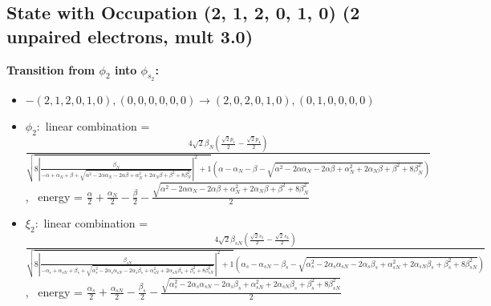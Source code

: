 \documentclass[12pt,a4paper]{article}
\begin{document}
\subsection*{State with Occupation (2, 1, 2, 0, 1, 0) (2 unpaired electrons, mult 3.0)}
        \noindent\textbf{Transition from $\phi_{2}$ into $\phi_{s_{2}}$:}
        \begin{itemize}
            \item $- (2, 1, 2, 0, 1, 0), (0, 0, 0, 0, 0, 0) \rightarrow (2, 0, 2, 0, 1, 0), (0, 1, 0, 0, 0, 0)$
        
            \item $\phi_{2}:$ linear combination = $\frac{4 \sqrt{2} \beta_{N} \left(\frac{\sqrt{2} p_{1}}{2} - \frac{\sqrt{2} p_{4}}{2}\right)}{\sqrt{8 \left|{\frac{\beta_{N}}{- \alpha + \alpha_{N} + \beta + \sqrt{\alpha^{2} - 2 \alpha \alpha_{N} - 2 \alpha \beta + \alpha_{N}^{2} + 2 \alpha_{N} \beta + \beta^{2} + 8 \beta_{N}^{2}}}}\right|^{2} + 1} \left(\alpha - \alpha_{N} - \beta - \sqrt{\alpha^{2} - 2 \alpha \alpha_{N} - 2 \alpha \beta + \alpha_{N}^{2} + 2 \alpha_{N} \beta + \beta^{2} + 8 \beta_{N}^{2}}\right)}$, \
            energy = $\frac{\alpha}{2} + \frac{\alpha_{N}}{2} - \frac{\beta}{2} - \frac{\sqrt{\alpha^{2} - 2 \alpha \alpha_{N} - 2 \alpha \beta + \alpha_{N}^{2} + 2 \alpha_{N} \beta + \beta^{2} + 8 \beta_{N}^{2}}}{2}$
            
            \item $\xi_{2}:$ linear combination = $\frac{4 \sqrt{2} \beta_{s N} \left(\frac{\sqrt{2} s_{1}}{2} - \frac{\sqrt{2} s_{4}}{2}\right)}{\sqrt{8 \left|{\frac{\beta_{s N}}{- \alpha_{s} + \alpha_{s N} + \beta_{s} + \sqrt{\alpha_{s}^{2} - 2 \alpha_{s} \alpha_{s N} - 2 \alpha_{s} \beta_{s} + \alpha_{s N}^{2} + 2 \alpha_{s N} \beta_{s} + \beta_{s}^{2} + 8 \beta_{s N}^{2}}}}\right|^{2} + 1} \left(\alpha_{s} - \alpha_{s N} - \beta_{s} - \sqrt{\alpha_{s}^{2} - 2 \alpha_{s} \alpha_{s N} - 2 \alpha_{s} \beta_{s} + \alpha_{s N}^{2} + 2 \alpha_{s N} \beta_{s} + \beta_{s}^{2} + 8 \beta_{s N}^{2}}\right)}$, \
            energy = $\frac{\alpha_{s}}{2} + \frac{\alpha_{s N}}{2} - \frac{\beta_{s}}{2} - \frac{\sqrt{\alpha_{s}^{2} - 2 \alpha_{s} \alpha_{s N} - 2 \alpha_{s} \beta_{s} + \alpha_{s N}^{2} + 2 \alpha_{s N} \beta_{s} + \beta_{s}^{2} + 8 \beta_{s N}^{2}}}{2}$
            

\end{itemize}
\end{document}
